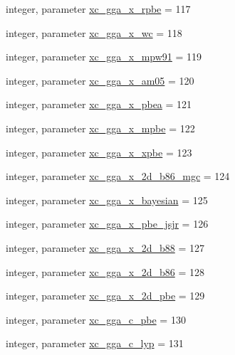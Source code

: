 \begin{DoxyCompactItemize}
\item 
integer, parameter \hyperlink{classlibxc__funcs__m_a0124bc49517ef17c1379cfcd1ecb2324}{xc\-\_\-gga\-\_\-x\-\_\-rpbe} = 117
\item 
integer, parameter \hyperlink{classlibxc__funcs__m_a15a8608915b25fc8324a8f9f6e208fa8}{xc\-\_\-gga\-\_\-x\-\_\-wc} = 118
\item 
integer, parameter \hyperlink{classlibxc__funcs__m_a50b1d21fd18cf6a21d617c73653fc4d2}{xc\-\_\-gga\-\_\-x\-\_\-mpw91} = 119
\item 
integer, parameter \hyperlink{classlibxc__funcs__m_a761deead1a0f8566c2b5edd476020c95}{xc\-\_\-gga\-\_\-x\-\_\-am05} = 120
\item 
integer, parameter \hyperlink{classlibxc__funcs__m_a23b9a3245f9e38fbeb8c889b30b8b441}{xc\-\_\-gga\-\_\-x\-\_\-pbea} = 121
\item 
integer, parameter \hyperlink{classlibxc__funcs__m_a2ccc7584a911e69df553ef763ad59eb8}{xc\-\_\-gga\-\_\-x\-\_\-mpbe} = 122
\item 
integer, parameter \hyperlink{classlibxc__funcs__m_a791fdf57701b34ba598f2e7dcd1ddddc}{xc\-\_\-gga\-\_\-x\-\_\-xpbe} = 123
\item 
integer, parameter \hyperlink{classlibxc__funcs__m_a10f09a249e6a83a164f8b898eec0f1af}{xc\-\_\-gga\-\_\-x\-\_\-2d\-\_\-b86\-\_\-mgc} = 124
\item 
integer, parameter \hyperlink{classlibxc__funcs__m_a5e7eeca943eb42a957300625335f885b}{xc\-\_\-gga\-\_\-x\-\_\-bayesian} = 125
\item 
integer, parameter \hyperlink{classlibxc__funcs__m_adb80ebb4de8d6df67a73d5d3b8acfda4}{xc\-\_\-gga\-\_\-x\-\_\-pbe\-\_\-jsjr} = 126
\item 
integer, parameter \hyperlink{classlibxc__funcs__m_ae103757b8e60f5ad6b251dc26c856ade}{xc\-\_\-gga\-\_\-x\-\_\-2d\-\_\-b88} = 127
\item 
integer, parameter \hyperlink{classlibxc__funcs__m_af2e15afb1fd6df4d06cd7f9d1c13129a}{xc\-\_\-gga\-\_\-x\-\_\-2d\-\_\-b86} = 128
\item 
integer, parameter \hyperlink{classlibxc__funcs__m_afc30c55391b0c919af0dbb60dae2c3d2}{xc\-\_\-gga\-\_\-x\-\_\-2d\-\_\-pbe} = 129
\item 
integer, parameter \hyperlink{classlibxc__funcs__m_a4e4708cc4fdcd0bff879f076dcc3fc6d}{xc\-\_\-gga\-\_\-c\-\_\-pbe} = 130
\item 
integer, parameter \hyperlink{classlibxc__funcs__m_a45cb170513b8d6267dfe5b2e2868e75f}{xc\-\_\-gga\-\_\-c\-\_\-lyp} = 131
\item 

\end{DoxyCompactItemize}
